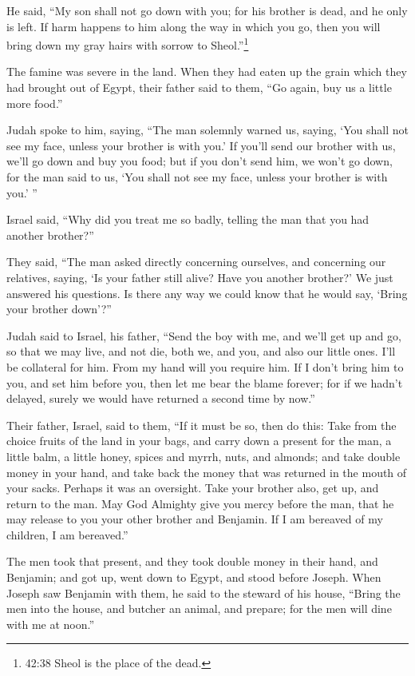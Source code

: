 \myverse{}He said, “My son shall not go down with you; for his brother is dead, and he only is left. If harm happens to him along the way in which you go, then you will bring down my gray hairs with sorrow to Sheol.”\footnote{42:38 Sheol is the place of the dead.}

\mychapter{}
\myverse*{}The famine was severe in the land.  \myverse{}When they had eaten up the grain which they had brought out of Egypt, their father said to them, “Go again, buy us a little more food.”

\myverse{}Judah spoke to him, saying, “The man solemnly warned us, saying, ‘You shall not see my face, unless your brother is with you.’  \myverse{}If you’ll send our brother with us, we’ll go down and buy you food;  \myverse{}but if you don’t send him, we won’t go down, for the man said to us, ‘You shall not see my face, unless your brother is with you.’ ”

\myverse{}Israel said, “Why did you treat me so badly, telling the man that you had another brother?”

\myverse{}They said, “The man asked directly concerning ourselves, and concerning our relatives, saying, ‘Is your father still alive? Have you another brother?’ We just answered his questions. Is there any way we could know that he would say, ‘Bring your brother down’?”

\myverse{}Judah said to Israel, his father, “Send the boy with me, and we’ll get up and go, so that we may live, and not die, both we, and you, and also our little ones.  \myverse{}I’ll be collateral for him. From my hand will you require him. If I don’t bring him to you, and set him before you, then let me bear the blame forever;  \myverse{}for if we hadn’t delayed, surely we would have returned a second time by now.”

\myverse{}Their father, Israel, said to them, “If it must be so, then do this: Take from the choice fruits of the land in your bags, and carry down a present for the man, a little balm, a little honey, spices and myrrh, nuts, and almonds;  \myverse{}and take double money in your hand, and take back the money that was returned in the mouth of your sacks. Perhaps it was an oversight.  \myverse{}Take your brother also, get up, and return to the man.  \myverse{}May God Almighty give you mercy before the man, that he may release to you your other brother and Benjamin. If I am bereaved of my children, I am bereaved.”

\myverse{}The men took that present, and they took double money in their hand, and Benjamin; and got up, went down to Egypt, and stood before Joseph.  \myverse{}When Joseph saw Benjamin with them, he said to the steward of his house, “Bring the men into the house, and butcher an animal, and prepare; for the men will dine with me at noon.”

